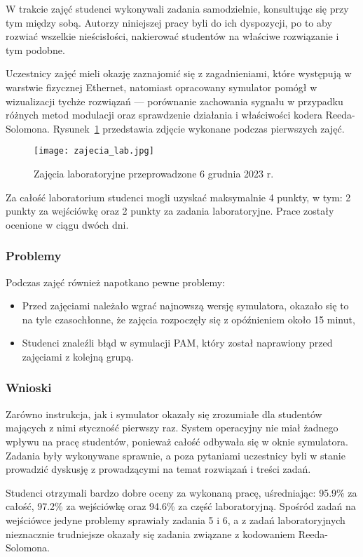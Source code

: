 W trakcie zajęć studenci wykonywali zadania samodzielnie, konsultując się przy tym między sobą. Autorzy niniejszej pracy
byli do ich dyspozycji, po to aby rozwiać wszelkie nieścisłości, nakierować studentów na właściwe rozwiązanie i tym podobne.

Uczestnicy zajęć mieli okazję zaznajomić się z zagadnieniami, które występują w warstwie fizycznej Ethernet, natomiast
opracowany symulator pomógł w wizualizacji tychże rozwiązań --- porównanie zachowania sygnału w przypadku różnych metod modulacji oraz
sprawdzenie działania i właściwości kodera Reeda-Solomona. Rysunek~\ref{fig:zajecia_lab_zdjecie} przedstawia zdjęcie wykonane podczas pierwszych zajęć.

\begin{figure}[H]
    \centering
    \texttt{[image: zajecia\_lab.jpg]}
    \caption{Zajęcia laboratoryjne przeprowadzone 6 grudnia 2023 r.}
    \label{fig:zajecia_lab_zdjecie}
\end{figure}

Za całość laboratorium studenci mogli uzyskać maksymalnie 4 punkty, w tym: 2 punkty za wejściówkę oraz 2 punkty za zadania laboratoryjne. Prace zostały ocenione w ciągu dwóch dni.

\subsubsection{Problemy}
Podczas zajęć również napotkano pewne problemy:
\begin{itemize}
    \item Przed zajęciami należało wgrać najnowszą wersję symulatora, okazało się to na tyle czasochłonne, że zajęcia rozpoczęły się z opóźnieniem około 15 minut,
    \item Studenci znaleźli błąd w symulacji PAM, który został naprawiony przed zajęciami z kolejną grupą.
\end{itemize}

\subsubsection{Wnioski}
Zarówno instrukcja, jak i symulator okazały się zrozumiałe dla studentów mających z nimi styczność pierwszy raz. System operacyjny nie miał żadnego wpływu na pracę studentów, ponieważ całość odbywała się w oknie symulatora. Zadania były wykonywane sprawnie, a poza pytaniami uczestnicy byli w stanie prowadzić dyskusję z prowadzącymi na temat rozwiązań i treści zadań.

Studenci otrzymali bardzo dobre oceny za wykonaną pracę, uśredniając: 95.9\% za całość, 97.2\% za wejściówkę oraz 94.6\% za część laboratoryjną. Spośród zadań na wejściówce jedyne problemy sprawiały zadania 5 i 6, a z zadań laboratoryjnych nieznacznie trudniejsze okazały się zadania związane z kodowaniem Reeda-Solomona.
